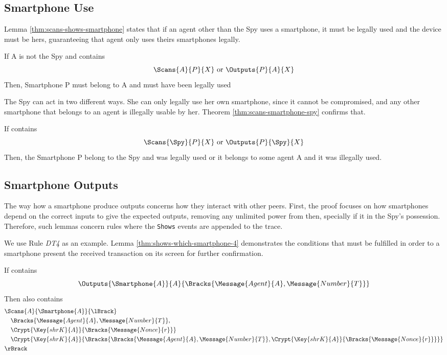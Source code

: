 \subsection{Smartphone Use}
Lemma \ref{thm:scans-shows-smartphone} states that if an agent other than the Spy uses a smartphone, it must be legally used and the device must be hers, guaranteeing that agent only uses theirs smartphones legally.

\begin{lemma}
\label{thm:scans-shows-smartphone}
  If A is not the Spy and  contains
  \[\Scans{A}{P}{X}\ \text{or}\ \Outputs{P}{A}{X}\]
  Then, Smartphone P must belong to A and must have been legally used
\end{lemma}

The Spy can act in two different ways. She can only legally use her own smartphone, since it cannot be compromised, and any other smartphone that belongs to an agent is illegally usable by her. Theorem \ref{thm:scans-smartphone-spy} confirms that.

\begin{lemma}
  \label{thm:scans-smartphone-spy}
  If  contains
  \[\Scans{\Spy}{P}{X} \ \text{or} \ \Outputs{P}{\Spy}{X}\]
  Then, the Smartphone P belong to the Spy and was legally used or it belongs to some agent A and it was illegally used.
\end{lemma}

\subsection{Smartphone Outputs}
The way how a smartphone produce outputs concerns how they interact with other peers. First, the proof focuses on how smartphones depend on the correct inputs to give the expected outputs, removing any unlimited power from then, specially if it in the Spy's possession. Therefore, such lemmas concern rules where the \texttt{Shows} events are appended to the trace. 

We use Rule \textit{DT4} as an example. Lemma \ref{thm:shows-which-smartphone-4} demonstrates the conditions that must be fulfilled in order to a smartphone present the received transaction on its screen for further confirmation. 

\begin{theorem}
\label{thm:shows-which-smartphone-4}
  If  contains
  \[\Outputs{\Smartphone{A}}{A}{\Bracks{\Message{Agent}{A}, \Message{Number}{T}}}\]
  Then  also contains
  \begin{align*}
    & \Scans{A}{\Smartphone{A}}{\lBrack} \\
      & \quad \Bracks{\Message{Agent}{A}, \Message{Number}{T}}, \\
      & \quad \Crypt{\Key{shrK}{A}}{\Bracks{\Message{Nonce}{r}}} \\
      & \quad \Crypt{\Key{shrK}{A}}{\Bracks{\Bracks{\Message{Agent}{A}, \Message{Number}{T}},\Crypt{\Key{shrK}{A}}{\Bracks{\Message{Nonce}{r}}}}} \\
    & \rBrack
  \end{align*}
\end{theorem}

